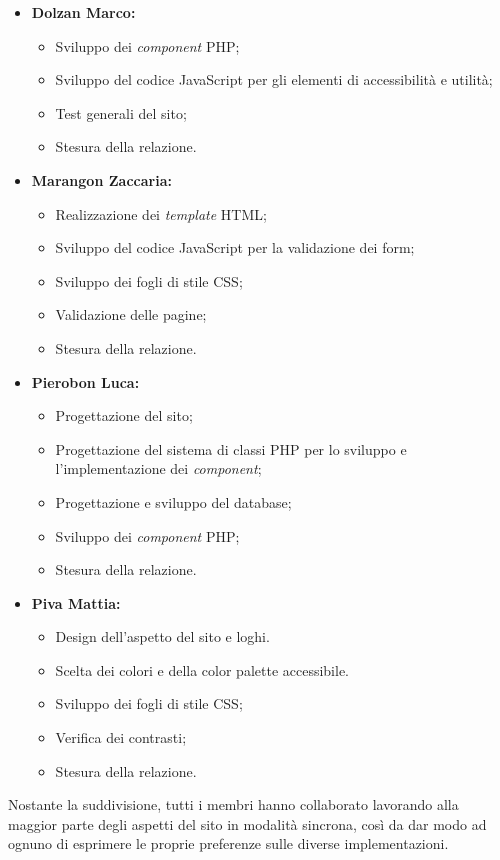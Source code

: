 \begin{itemize}
    \item \textbf{Dolzan Marco:}
        \begin{itemize}
            \item Sviluppo dei \textit{component} PHP;
            \item Sviluppo del codice JavaScript per gli elementi di accessibilità e utilità;
            \item Test generali del sito;
            \item Stesura della relazione.
        \end{itemize}
    \item \textbf{Marangon Zaccaria:}
        \begin{itemize}
            \item Realizzazione dei \textit{template} HTML;
            \item Sviluppo del codice JavaScript per la validazione dei form;
            \item Sviluppo dei fogli di stile CSS;
            \item Validazione delle pagine;
            \item Stesura della relazione.
        \end{itemize}
    \item \textbf{Pierobon Luca:}
        \begin{itemize}
            \item Progettazione del sito;
            \item Progettazione del sistema di classi PHP per lo sviluppo e l'implementazione dei \textit{component};
            \item Progettazione e sviluppo del database;
            \item Sviluppo dei \textit{component} PHP;
            \item Stesura della relazione.
        \end{itemize}
    \item \textbf{Piva Mattia:}
        \begin{itemize}
            \item Design dell'aspetto del sito e loghi.
            \item Scelta dei colori e della color palette accessibile.
            \item Sviluppo dei fogli di stile CSS;
            \item Verifica dei contrasti;
            \item Stesura della relazione.
        \end{itemize}
\end{itemize}

Nostante la suddivisione, tutti i membri hanno collaborato lavorando alla maggior parte degli aspetti del sito in modalità sincrona, così da dar modo ad ognuno di esprimere le proprie preferenze sulle diverse implementazioni.